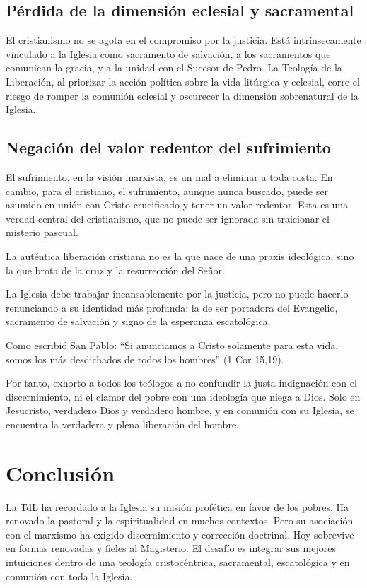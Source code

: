 \documentclass[12pt]{article}
\begin{document}
\subsection*{Pérdida de la dimensión eclesial y sacramental}
El cristianismo no se agota en el compromiso por la justicia. Está intrínsecamente vinculado a la Iglesia como sacramento de salvación, a los sacramentos que comunican la gracia, y a la unidad con el Sucesor de Pedro. La Teología de la Liberación, al priorizar la acción política sobre la vida litúrgica y eclesial, corre el riesgo de romper la comunión eclesial y oscurecer la dimensión sobrenatural de la Iglesia.

\subsection*{Negación del valor redentor del sufrimiento}
El sufrimiento, en la visión marxista, es un mal a eliminar a toda costa. En cambio, para el cristiano, el sufrimiento, aunque nunca buscado, puede ser asumido en unión con Cristo crucificado y tener un valor redentor. Esta es una verdad central del cristianismo, que no puede ser ignorada sin traicionar el misterio pascual.

La auténtica liberación cristiana no es la que nace de una praxis ideológica, sino la que brota de la cruz y la resurrección del Señor.

La Iglesia debe trabajar incansablemente por la justicia, pero no puede hacerlo renunciando a su identidad más profunda: la de ser portadora del Evangelio, sacramento de salvación y signo de la esperanza escatológica.

Como escribió San Pablo: ``Si anunciamos a Cristo solamente para esta vida, somos los más desdichados de todos los hombres'' (1 Cor 15,19).

Por tanto, exhorto a todos los teólogos a no confundir la justa indignación con el discernimiento, ni el clamor del pobre con una ideología que niega a Dios. Solo en Jesucristo, verdadero Dios y verdadero hombre, y en comunión con su Iglesia, se encuentra la verdadera y plena liberación del hombre.
\section*{Conclusión}

La TdL ha recordado a la Iglesia su misión profética en favor de los pobres. Ha renovado la pastoral y la espiritualidad en muchos contextos. Pero su asociación con el marxismo ha exigido discernimiento y corrección doctrinal. Hoy sobrevive en formas renovadas y fieles al Magisterio. El desafío es integrar sus mejores intuiciones dentro de una teología cristocéntrica, sacramental, escatológica y en comunión con toda la Iglesia.
\end{document}

